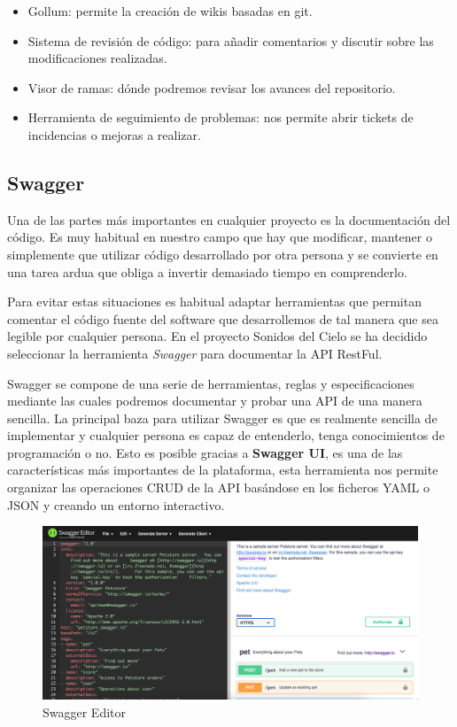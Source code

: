 \begin{itemize}
    \item Gollum: permite la creación de wikis basadas en git.
    \item Sistema de revisión de código: para añadir comentarios y discutir sobre las modificaciones realizadas.
    \item Visor de ramas: dónde podremos revisar los avances del repositorio.
    \item Herramienta de seguimiento de problemas: nos permite abrir tickets de incidencias o mejoras a realizar.
\end{itemize}


\subsection{Swagger}
Una de las partes más importantes en cualquier proyecto es la documentación del código. Es muy habitual en nuestro campo que hay que modificar, mantener o simplemente que utilizar código desarrollado por otra persona y se convierte en una tarea ardua que obliga a invertir demasiado tiempo en comprenderlo. 

Para evitar estas situaciones es habitual adaptar herramientas que permitan comentar el código fuente del software que desarrollemos de tal manera que sea legible por cualquier persona. En el proyecto Sonidos del Cielo se ha decidido seleccionar la herramienta \textit{Swagger} para documentar la API RestFul. 

Swagger se compone de una serie de herramientas, reglas y especificaciones mediante las cuales podremos documentar y probar una API de una manera sencilla. La principal baza para utilizar Swagger es que es realmente sencilla de implementar y cualquier persona es capaz de entenderlo, tenga conocimientos de programación o no. Esto es posible gracias a \textbf{Swagger UI}, es una de las características más importantes de la plataforma, esta herramienta nos permite organizar las operaciones CRUD de la API basándose en los ficheros YAML o JSON y creando un entorno interactivo.

\begin{figure}[H]
    \centering
    \includegraphics[width=\textwidth]{include/capturas/SwaggerEditorOnline.png}
    \caption{Swagger Editor}
    \label{fig:swagger_online}
\end{figure}

